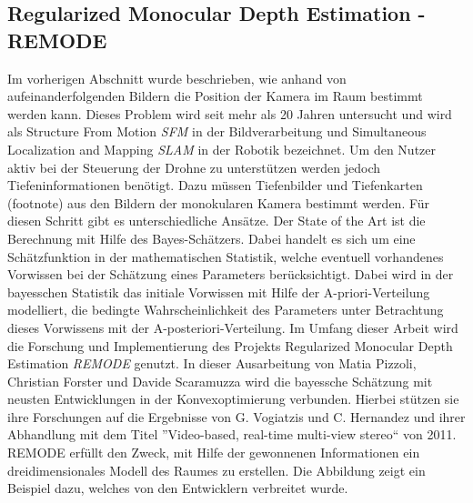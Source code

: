 \subsection{Regularized Monocular Depth Estimation - REMODE}
Im vorherigen Abschnitt wurde beschrieben, wie anhand von aufeinanderfolgenden Bildern die Position der Kamera im Raum bestimmt werden kann. Dieses Problem wird seit mehr als 20 Jahren untersucht und wird als Structure From Motion \emph{SFM} in der Bildverarbeitung und Simultaneous Localization and Mapping \emph{SLAM} in der Robotik bezeichnet. \newline
Um den Nutzer aktiv bei der Steuerung der Drohne zu unterstützen werden jedoch Tiefeninformationen benötigt. Dazu müssen Tiefenbilder und Tiefenkarten (footnote) aus den Bildern der monokularen Kamera bestimmt werden. \newline
Für diesen Schritt gibt es unterschiedliche Ansätze. Der State of the Art ist die Berechnung mit Hilfe des Bayes-Schätzers. Dabei handelt es sich um eine Schätzfunktion in der mathematischen Statistik, welche eventuell vorhandenes Vorwissen bei der Schätzung eines Parameters berücksichtigt. Dabei wird in der bayesschen Statistik das initiale Vorwissen mit Hilfe der A-priori-Verteilung modelliert, die bedingte Wahrscheinlichkeit des Parameters unter Betrachtung dieses Vorwissens mit der A-posteriori-Verteilung. \newline
Im Umfang dieser Arbeit wird die Forschung und Implementierung des Projekts Regularized Monocular Depth Estimation \emph{REMODE} genutzt. In dieser Ausarbeitung von Matia Pizzoli, Christian Forster und Davide Scaramuzza wird die bayessche Schätzung mit neusten Entwicklungen in der Konvexoptimierung verbunden. Hierbei stützen sie ihre Forschungen auf die Ergebnisse von G. Vogiatzis und C. Hernandez und ihrer Abhandlung mit dem Titel ''Video-based, real-time multi-view stereo`` von 2011. \newline
REMODE erfüllt den Zweck, mit Hilfe der gewonnenen Informationen ein dreidimensionales Modell des Raumes zu erstellen. Die Abbildung zeigt ein Beispiel dazu, welches von den Entwicklern verbreitet wurde. \newline


